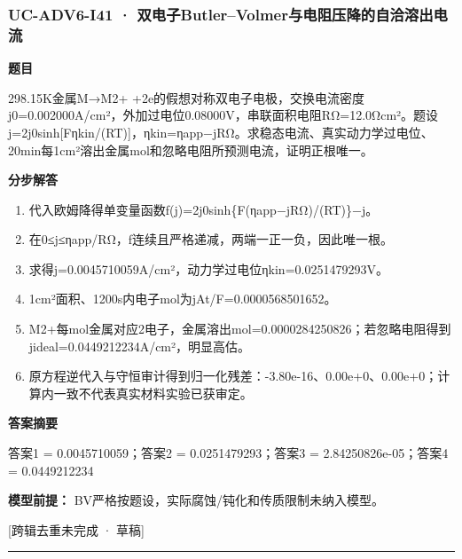\documentclass[UTF8,11pt,a4paper]{ctexart}
\begin{document}
\subsubsection*{UC-ADV6-I41 · 双电子Butler–Volmer与电阻压降的自洽溶出电流}
\noindent\textbf{题目}\par
298.15K金属M→M2+ +2e的假想对称双电子电极，交换电流密度j0=0.002000A/cm²，外加过电位0.08000V，串联面积电阻RΩ=12.0Ωcm²。题设j=2j0sinh[Fηkin/(RT)]，ηkin=ηapp−jRΩ。求稳态电流、真实动力学过电位、20min每1cm²溶出金属mol和忽略电阻所预测电流，证明正根唯一。\par
\medskip\noindent\textbf{分步解答}
\begin{enumerate}
\item 代入欧姆降得单变量函数f(j)=2j0sinh\{F(ηapp−jRΩ)/(RT)\}−j。
\item 在0≤j≤ηapp/RΩ，f连续且严格递减，两端一正一负，因此唯一根。
\item 求得j=0.0045710059A/cm²，动力学过电位ηkin=0.0251479293V。
\item 1cm²面积、1200s内电子mol为jAt/F=0.0000568501652。
\item M2+每mol金属对应2电子，金属溶出mol=0.0000284250826；若忽略电阻得到jideal=0.0449212234A/cm²，明显高估。
\item 原方程逆代入与守恒审计得到归一化残差：-3.80e-16、0.00e+0、0.00e+0；计算内一致不代表真实材料实验已获审定。
\end{enumerate}
\noindent\textbf{答案摘要}\par
答案1 = 0.0045710059；答案2 = 0.0251479293；答案3 = 2.84250826e-05；答案4 = 0.0449212234\par
\noindent\textbf{模型前提：}
BV严格按题设，实际腐蚀/钝化和传质限制未纳入模型。\par
\noindent\textcolor{red!65!black}{[跨辑去重未完成 · 草稿]} \par
\medskip\hrule\medskip
{}
\end{document}
